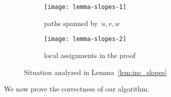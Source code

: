 \documentclass[a4paper,11pt]{article}
\theoremstyle{plain}
\begin{document}
  \begin{figure}[tb]
    \hfill
    \begin{subfigure}[b]{.45\columnwidth}
      \centering
      \texttt{[image: lemma-slopes-1]}
      \caption{paths spanned by~$u,v,w$ }
      \label{fig:slopelem1}
    \end{subfigure}
    \hfill
    \begin{subfigure}[b]{.45\columnwidth}
      \centering
      \texttt{[image: lemma-slopes-2]}
      \caption{local assignments in the proof}
      \label{fig:slopelem2}
    \end{subfigure}
    \hfill
    \caption{Situation analyzed in Lemma~\ref{lem:inc_slopes}}
  \end{figure}

We now prove the correctness of our algorithm.
\end{document}
